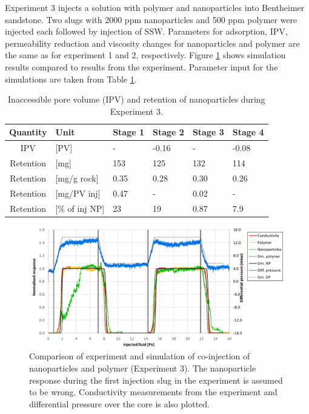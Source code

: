 \documentclass[journal = enfuem, manuscript =  article]{achemso}
\begin{document}
Experiment 3 injects a solution with polymer and nanoparticles into Bentheimer sandstone. Two slugs with 2000 ppm nanoparticles and 500 ppm polymer were injected each followed by injection of SSW. Parameters for adsorption, IPV, permeability reduction and viscosity changes for nanoparticles and polymer are the same as for experiment 1 and 2, respectively. Figure \ref{cht:simExpNP3} shows simulation results compared to results from the experiment. Parameter input for the simulations are taken from Table \ref{tab:ipvexp3}.

\begin{table} 
\small
\centering
\caption{Inaccessible pore volume (IPV) and retention of nanoparticles during Experiment 3.}
\label{tab:ipvexp3}
\begin{tabular}{c l l l l l } 
\toprule
\textbf{Quantity} & \textbf{Unit} & \textbf{Stage 1} & \textbf{Stage 2} & \textbf{Stage 3} & \textbf{Stage 4} \\ 
\midrule 
IPV         & [PV]          & -         & -0.16     & -         & -0.08     \\
Retention   & [mg]          & 153       & 125       & 132       & 114       \\ 
Retention   & [mg/g rock]   & 0.35      & 0.28     & 0.30     & 0.26     \\ 
Retention   & [mg/PV inj]   & 0.47      & -         & 0.02      & -         \\
Retention   & [\% of inj NP]& 23        & 19       & 0.87       & 7.9       \\ 
\bottomrule
\end{tabular}
\end{table}

\begin{figure}[h]
    \centering
    \includegraphics[width=\textwidth]{fig/simExpNP3.png}
    \caption{Comparison of experiment and simulation of co-injection of nanoparticles and polymer (Experiment 3). The nanoparticle response during the first injection slug in the experiment is assumed to be wrong. Conductivity measurements from the experiment and differential pressure over the core is also plotted.}
    \label{cht:simExpNP3}
\end{figure}
\end{document}
